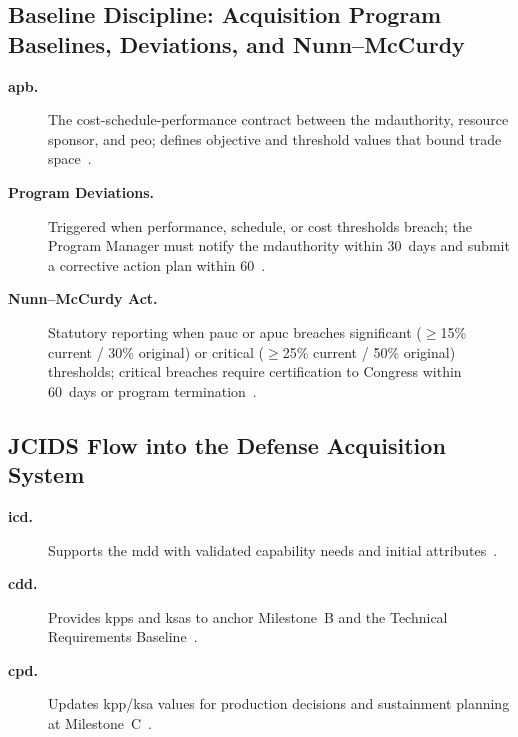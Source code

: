\documentclass[../main.tex]{subfiles}
\begin{document}
\subsection{Baseline Discipline: Acquisition Program Baselines, Deviations, and Nunn--McCurdy}
\begin{description}
	\item[\textbf{\ac{apb}.}] The cost-schedule-performance contract between the \ac{mdauthority}, resource sponsor, and \ac{peo}; defines objective and threshold values that bound trade space~\autocite{DoDI5000-85}.
	\item[\textbf{Program Deviations.}] Triggered when performance, schedule, or cost thresholds breach; the Program Manager must notify the \ac{mdauthority} within 30~days and submit a corrective action plan within 60~\autocite{DoDI5000-85}.
	\item[\textbf{Nunn--McCurdy Act.}] Statutory reporting when \ac{pauc} or \ac{apuc} breaches significant ($\geq$15\% current / 30\% original) or critical ($\geq$25\% current / 50\% original) thresholds; critical breaches require certification to Congress within 60~days or program termination~\autocite{USC-4371-NunnMcCurdy}.
\end{description}

\subsection{JCIDS Flow into the Defense Acquisition System}
\begin{description}
	\item[\textbf{\ac{icd}.}] Supports the \ac{mdd} with validated capability needs and initial attributes~\autocite{CJCSI5123-01H}.
	\item[\textbf{\ac{cdd}.}] Provides \acp{kpp} and \acp{ksa} to anchor Milestone~B and the Technical Requirements Baseline~\autocite{CJCSI5123-01H}.
	\item[\textbf{\ac{cpd}.}] Updates \ac{kpp}/\ac{ksa} values for production decisions and sustainment planning at Milestone~C~\autocite{CJCSI5123-01H}.
\end{description}
\end{document}

